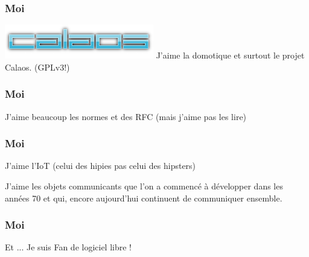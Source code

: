 \documentclass{smilebeamer}
\begin{document}
{
%
\begin{frame}
\end{frame}
}

\begin{frame}
\frametitle{Moi}

\begin{center}
\includegraphics{img/calaos_about_logo.png}
\newline
J'aime la domotique et surtout le projet Calaos. (GPLv3!)
\end{center}
\end{frame}

\begin{frame}
\frametitle{Moi}
\begin{center}
J'aime beaucoup les normes et des RFC
\newline 
(mais j'aime pas les lire)
\end{center}
\end{frame}

\begin{frame}
\frametitle{Moi}
\begin{center}
J'aime l'IoT (celui des hipies pas celui des hipsters)
\end{center}

J'aime les objets communicants que l'on a commencé à développer dans
les années 70 et qui, encore aujourd'hui continuent de communiquer
ensemble.
\end{frame}


\begin{frame}
\frametitle{Moi}
\begin{center}
Et ... Je suis Fan de logiciel libre !
\end{center}
\end{frame}
\end{document}

